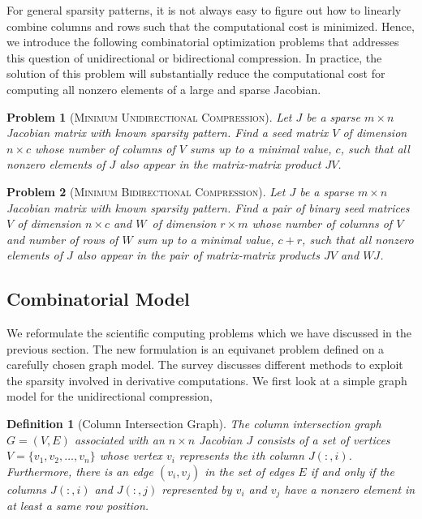 \documentclass[12pt, oneside]{book}
\newtheorem{problem}{Problem}
\newtheorem{definition}{Definition}
\newcommand{\col}{\ensuremath{c}}
\newcommand{\row}{\ensuremath{r}}
\newcommand{\MinUniCom}{\textsc{Minimum Unidirectional Compression}}
\newcommand{\MinBidCom}{\textsc{Minimum Bidirectional Compression}}
\begin{document}
For general sparsity patterns,
it is not always easy to figure out how to linearly combine columns and rows such that
the computational cost is minimized. Hence, we introduce the following combinatorial
optimization problems that addresses this question of unidirectional or bidirectional compression. 
In practice, the solution of this
problem will substantially reduce the computational cost for computing all nonzero
elements of a large and sparse Jacobian.

\begin{problem}[\MinUniCom]
\label{p.seed.uni} Let $J$ be a sparse ${m\times n}$ Jacobian matrix with known sparsity
pattern. Find a seed matrix $V$ of dimension $n\times \col$ 
whose number of columns of $V$ sums up
to a minimal value, $\col$, such that all nonzero elements of $J$ also appear in
the matrix-matrix product $JV$.
\end{problem}

\begin{problem}[\MinBidCom]
\label{p.seed.bid} Let $J$ be a sparse ${m\times n}$ Jacobian matrix with known sparsity
pattern. Find a pair of binary seed matrices $V$ of dimension $n\times \col$ and $W$~of
dimension $\row \times m$ whose number of columns of $V$ and number of rows of $W$ sum up
to a minimal value, $\col + \row$, such that all nonzero elements of $J$ also appear in
the pair of matrix-matrix products $JV$ and $WJ$.
\end{problem}

\subsection{Combinatorial Model}
\label{s.modeling}
We reformulate the scientific computing problems which we have discussed in the 
previous section. The new formulation is an equivanet problem defined on a
carefully chosen graph model. The survey \cite{Gebremedhin05whatcolor} 
discusses different methods
to exploit the sparsity involved in derivative computations.
We first look at a simple graph model for the unidirectional compression,
%
\begin{definition}[Column Intersection Graph]
\label{d:cig}
The column intersection graph $G = (V,E)$ associated with an $n \times n$ Jacobian $J$
consists of a set of vertices $V=\{v_1, v_2, \dots, v_n\}$ whose vertex $v_i$ represents
the $i$th column $J(:,i)$. Furthermore, there is an edge $(v_i,v_j)$ in the set of edges
$E$ if and only if the columns $J(:,i)$ and $J(:,j)$ represented by $v_i$ and $v_j$ have
a nonzero element in at least a same row position.
\end{definition}
\end{document}
